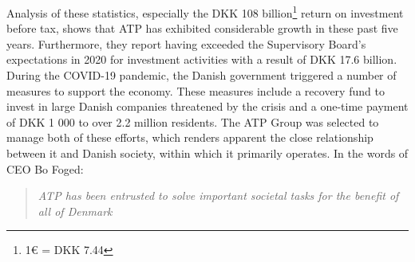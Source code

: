 Analysis of these statistics, especially the DKK 108 billion\footnote[0]{1€  =
DKK 7.44} return on investment before tax, shows that ATP has exhibited
considerable growth in these past five years. Furthermore, they report having
exceeded the Supervisory Board's expectations in 2020 for investment activities
with a result of DKK 17.6 billion.\cite{anno_report} During the COVID-19
pandemic, the Danish government triggered a number of measures to support the
economy. These measures include a recovery fund to invest in large Danish
companies threatened by the crisis and a one-time payment of DKK 1 000 to over
2.2 million residents. The ATP Group was selected to manage both of these
efforts, which renders apparent the close relationship between it and Danish
society, within which it primarily operates.\cite{covid_response} In the words
of CEO Bo Foged:

\begin{quote}
    \color{dgreen} \textit{ATP has been entrusted to solve important societal
    tasks for the benefit of all of Denmark}
\end{quote}
